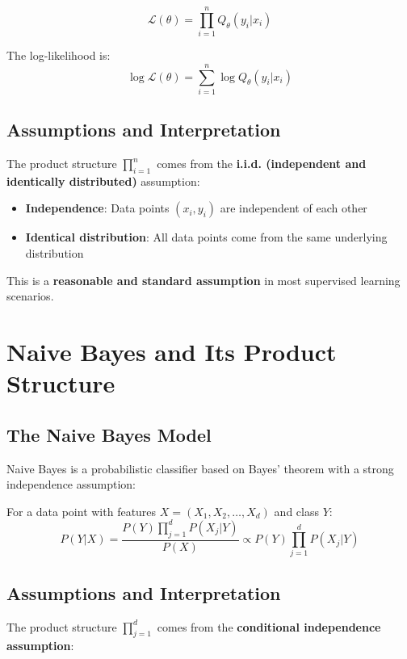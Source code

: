 \begin{notechapter}
\begin{definition}[Likelihood]
\[
\mathcal{L}(\theta) = \prod_{i=1}^n Q_\theta(y_i | x_i)
\]
\end{definition}

The log-likelihood is:
\[
\log \mathcal{L}(\theta) = \sum_{i=1}^n \log Q_\theta(y_i | x_i)
\]

\subsection{Assumptions and Interpretation}

The product structure $\prod_{i=1}^n$ comes from the \textbf{i.i.d. (independent and identically distributed)} assumption:

\begin{itemize}
    \item \textbf{Independence}: Data points $(x_i, y_i)$ are independent of each other
    \item \textbf{Identical distribution}: All data points come from the same underlying distribution
\end{itemize}

This is a \textbf{reasonable and standard assumption} in most supervised learning scenarios.

\section{Naive Bayes and Its Product Structure}

\subsection{The Naive Bayes Model}

Naive Bayes is a probabilistic classifier based on Bayes' theorem with a strong independence assumption:

\begin{definition}
For a data point with features $X = (X_1, X_2, \ldots, X_d)$ and class $Y$:
\[
P(Y|X) = \frac{P(Y) \prod_{j=1}^d P(X_j|Y)}{P(X)} \propto P(Y) \prod_{j=1}^d P(X_j|Y)
\]
\end{definition}

\subsection{Assumptions and Interpretation}

The product structure $\prod_{j=1}^d$ comes from the \textbf{conditional independence assumption}:


\end{notechapter}
